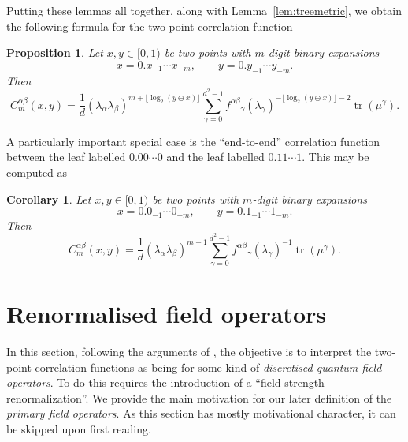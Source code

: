 \documentclass[11pt,oneside]{amsart}
\DeclareMathOperator{\tr}{tr}
\theoremstyle{plain}%
\newtheorem{proposition}[theorem]{Proposition}
\newtheorem*{corollary}{Corollary}
\theoremstyle{definition}
\theoremstyle{remark}
\begin{document}
Putting these lemmas all together, along with Lemma~\ref{lem:treemetric}, we obtain the following formula for the two-point correlation function
\begin{proposition}
	Let $x, y\in [0,1)$ be two points with $m$-digit binary expansions
	\begin{equation}
		x = 0.x_{-1}\cdots x_{-m}, \qquad y = 0.y_{-1}\cdots y_{-m}.
	\end{equation}
	Then
	\begin{equation}
		C^{\alpha\beta}_m(x,y) = \frac1d (\lambda_\alpha\lambda_\beta)^{m+\lfloor \log_2(y\ominus x) \rfloor} \sum_{\gamma = 0}^{d^2-1} {f^{\alpha\beta}}_\gamma (\lambda_{\gamma})^{-\lfloor \log_2(y\ominus x) \rfloor-2} \tr(\mu^\gamma).
	\end{equation}
\end{proposition}
A particularly important special case is the ``end-to-end'' correlation function between the leaf labelled $0.00\cdots0$ and the leaf labelled $0.11\cdots 1$. This may be computed as
\begin{corollary}
	Let $x, y\in [0,1)$ be two points with $m$-digit binary expansions
	\begin{equation}
		x = 0.0_{-1} \cdots 0_{-m}, \qquad y = 0.1_{-1}\cdots 1_{-m}.
	\end{equation}
	Then
	\begin{equation}
		C^{\alpha\beta}_m(x,y) = \frac1d (\lambda_\alpha\lambda_\beta)^{m-1} \sum_{\gamma = 0}^{d^2-1} {f^{\alpha\beta}}_\gamma (\lambda_{\gamma})^{-1} \tr(\mu^\gamma).
	\end{equation}
\end{corollary}

\section{Renormalised field operators}\label{sec:renormfieldoprs}

In this section, following the arguments of \cite{osborneContinuumLimitsQuantum2019}, the objective is to interpret the two-point correlation functions as being for some kind of \emph{discretised quantum field operators}. To do this requires the introduction of a ``field-strength renormalization''. We provide the main motivation for our later definition of the \emph{primary field operators}. As this section has mostly motivational character, it can be skipped upon first reading.
\end{document}
